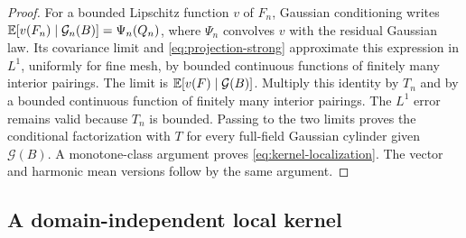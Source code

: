 \begin{proof}
For a bounded Lipschitz function \(v\) of \(F_n\), Gaussian conditioning
writes
\(\mathbb E[v(F_n)\mid\mathcal G_n(B)]=\Psi_n(Q_n)\), where \(\Psi_n\)
convolves \(v\) with the residual Gaussian law. Its covariance limit
and \eqref{eq:projection-strong} approximate this expression in \(L^1\),
uniformly for fine mesh, by bounded continuous functions of finitely
many interior pairings. The limit is
\(\mathbb E[v(F)\mid\mathcal G(B)]\). Multiply this identity by \(T_n\) and
by a bounded continuous function of finitely many interior pairings.
The \(L^1\) error remains valid because \(T_n\) is bounded. Passing to
the two limits proves the conditional factorization with \(T\) for every
full-field Gaussian cylinder given \(\mathcal G(B)\). A monotone-class
argument proves \eqref{eq:kernel-localization}. The vector and harmonic
mean versions follow by the same argument.
\end{proof}

\subsection{A domain-independent local kernel}

